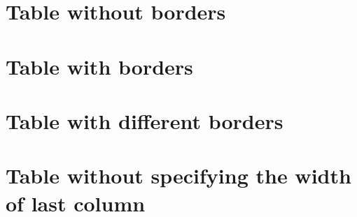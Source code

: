 \documentclass{article}
\begin{document}
\section{Table without borders}


\section{Table with borders}




\section{Table with different borders}




\section{Table without specifying the width of last column}
\end{document}

